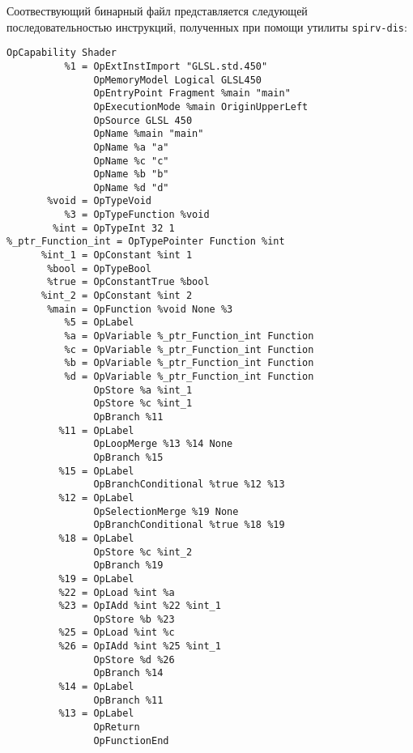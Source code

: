 \documentclass[14pt]{extarticle}
\begin{document}
Соотвествующий бинарный файл представляется следующей последовательностью инструкций, полученных при помощи утилиты \texttt{spirv-dis}:
\begin{lstlisting}[caption={бинарный \texttt{SPIR-V} файл до преобразований}]
               OpCapability Shader
          %1 = OpExtInstImport "GLSL.std.450"
               OpMemoryModel Logical GLSL450
               OpEntryPoint Fragment %main "main"
               OpExecutionMode %main OriginUpperLeft
               OpSource GLSL 450
               OpName %main "main"
               OpName %a "a"
               OpName %c "c"
               OpName %b "b"
               OpName %d "d"
       %void = OpTypeVoid
          %3 = OpTypeFunction %void
        %int = OpTypeInt 32 1
%_ptr_Function_int = OpTypePointer Function %int
      %int_1 = OpConstant %int 1
       %bool = OpTypeBool
       %true = OpConstantTrue %bool
      %int_2 = OpConstant %int 2
       %main = OpFunction %void None %3
          %5 = OpLabel
          %a = OpVariable %_ptr_Function_int Function
          %c = OpVariable %_ptr_Function_int Function
          %b = OpVariable %_ptr_Function_int Function
          %d = OpVariable %_ptr_Function_int Function
               OpStore %a %int_1
               OpStore %c %int_1
               OpBranch %11
         %11 = OpLabel
               OpLoopMerge %13 %14 None
               OpBranch %15
         %15 = OpLabel
               OpBranchConditional %true %12 %13
         %12 = OpLabel
               OpSelectionMerge %19 None
               OpBranchConditional %true %18 %19
         %18 = OpLabel
               OpStore %c %int_2
               OpBranch %19
         %19 = OpLabel
         %22 = OpLoad %int %a
         %23 = OpIAdd %int %22 %int_1
               OpStore %b %23
         %25 = OpLoad %int %c
         %26 = OpIAdd %int %25 %int_1
               OpStore %d %26
               OpBranch %14
         %14 = OpLabel
               OpBranch %11
         %13 = OpLabel
               OpReturn
               OpFunctionEnd

\end{lstlisting}
~\\ %
\end{document}
